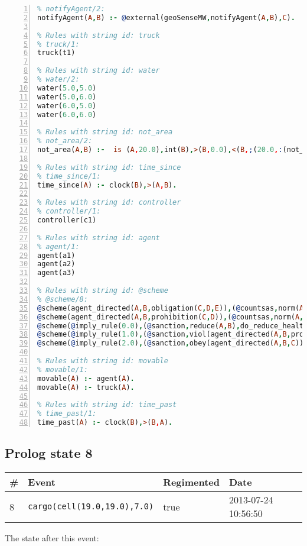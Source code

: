 \documentclass[11pt]{article}\usepackage[utf8]{inputenc}\usepackage{geometry}
\begin{document}
\begin{lstlisting}[language=Prolog, numbers=left]
% Rules with string id: notifyAgent
% notifyAgent/2:
notifyAgent(A,B) :- @external(geoSenseMW,notifyAgent(A,B),C).

% Rules with string id: truck
% truck/1:
truck(t1)

% Rules with string id: water
% water/2:
water(5.0,5.0)
water(5.0,6.0)
water(6.0,5.0)
water(6.0,6.0)

% Rules with string id: not_area
% not_area/2:
not_area(A,B) :-  is (A,20.0),int(B),>(B,0.0),<(B,;(20.0,:(not_area(A,B), is (-(B),20.0)))),int(A),>(A,0.0),<(A,;(20.0,:(area(A,B),-(int(A))))),int(B),>(A,0.0),>(B,0.0),<(A,21.0),<(B,21.0).

% Rules with string id: time_since
% time_since/1:
time_since(A) :- clock(B),>(A,B).

% Rules with string id: controller
% controller/1:
controller(c1)

% Rules with string id: agent
% agent/1:
agent(a1)
agent(a2)
agent(a3)

% Rules with string id: @scheme
% @scheme/8:
@scheme(agent_directed(A,B,obligation(C,D,E)),(@countsas,norm(A,B,F,obligation(C,D,E)),F),false,(listTrue(C)),(time_past(D)),false,[plus(viol(agent_directed(A,B,obligation(C,D,E))))|[]],[plus(obey(agent_directed(A,B,obligation(C,D,E))))|[]])
@scheme(agent_directed(A,B,prohibition(C,D)),(@countsas,norm(A,B,E,prohibition(C,D)),E),(listTrue(C)),false,(false),false,[plus(viol(agent_directed(A,B,prohibition(C,D))))|[]],[plus(obey(agent_directed(A,B,prohibition(C,D))))|[]])
@scheme(@imply_rule(0.0),(@sanction,reduce(A,B),do_reduce_health(A,B),notifyAgent(A,changed(status))),true,false,false,false,[min(reduce(A,B))|[]],[])
@scheme(@imply_rule(1.0),(@sanction,viol(agent_directed(A,B,prohibition(C,D))),do_sanction(D)),true,false,false,false,[min(viol(agent_directed(A,B,prohibition(C,D))))|[]],[])
@scheme(@imply_rule(2.0),(@sanction,obey(agent_directed(A,B,C))),true,false,false,false,[min(obey(agent_directed(A,B,C)))|[]],[])

% Rules with string id: movable
% movable/1:
movable(A) :- agent(A).
movable(A) :- truck(A).

% Rules with string id: time_past
% time_past/1:
time_past(A) :- clock(B),>(B,A).

\end{lstlisting}
\clearpage 
\subsection{Prolog state 8}
\begin{table}[ht]
\centering 
\begin{tabular}{l l l l} 
\textbf{\#} & \textbf{Event} & \textbf{Regimented} & \textbf{Date} \\ [0.5ex] 
\hline
8&\texttt{cargo(cell(19.0,19.0),7.0)}&true&2013-07-24 10:56:50\\ [1ex] \hline\end{tabular}
\end{table}
The state after this event:
\end{document}
